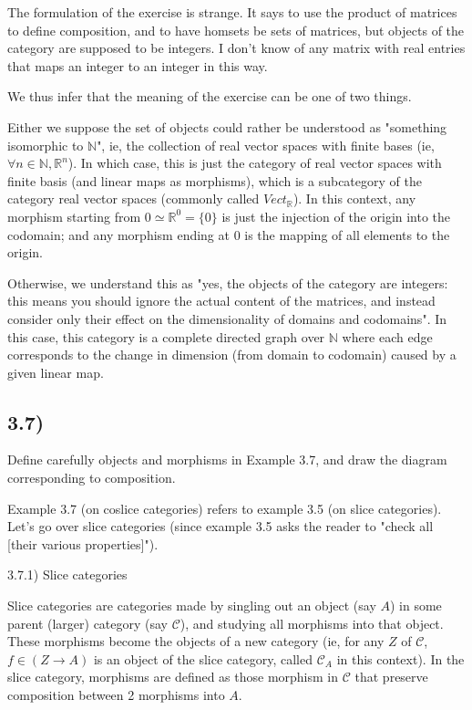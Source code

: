 \documentclass[12pt, letterpaper, twoside]{report}
\begin{document}
The formulation of the exercise is strange. It says to use the product of matrices to define composition, and to have homsets be sets of matrices, but objects of the category are supposed to be integers. I don't know of any matrix with real entries that maps an integer to an integer in this way.

We thus infer that the meaning of the exercise can be one of two things.

Either we suppose the set of objects could rather be understood as "something isomorphic to $\mathbb{N}$", ie, the collection of real vector spaces with finite bases (ie, $\forall n \in \mathbb{N}, \mathbb{R}^n$). In which case, this is just the category of real vector spaces with finite basis (and linear maps as morphisms), which is a subcategory of the category real vector spaces (commonly called $Vect_{\mathbb{R}}$). In this context, any morphism starting from $0 \simeq \mathbb{R}^0 = \{0\}$ is just the injection of the origin into the codomain; and any morphism ending at $0$ is the mapping of all elements to the origin.

Otherwise, we understand this as "yes, the objects of the category are integers: this means you should ignore the actual content of the matrices, and instead consider only their effect on the dimensionality of domains and codomains". In this case, this category is a complete directed graph over $\mathbb{N}$ where each edge corresponds to the change in dimension (from domain to codomain) caused by a given linear map.



\subsection*{3.7)}

Define carefully objects and morphisms in Example 3.7, and draw the diagram corresponding to composition.

Example 3.7 (on coslice categories) refers to example 3.5 (on slice categories). Let's go over slice categories (since example 3.5 asks the reader to "check all [their various properties]").

3.7.1) Slice categories

Slice categories are categories made by singling out an object (say $A$) in some parent (larger) category (say $\mathcal{C}$), and studying all morphisms into that object. These morphisms become the objects of a new category (ie, for any $Z$ of $\mathcal{C}$, $f \in (Z \to A)$ is an object of the slice category, called $\mathcal{C}_A$ in this context). In the slice category, morphisms are defined as those morphism in $\mathcal{C}$ that preserve composition between 2 morphisms into $A$.
\end{document}
